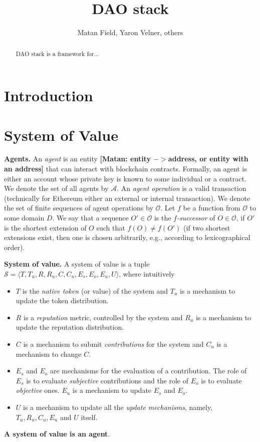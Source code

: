 \documentclass[10pt]{llncs}
\newcommand{\MyComment}[1]{{\textbf{\color{blue} [Matan: #1]}}}
\begin{document}
%

\pagestyle{plain}
 


\newcommand{\AppendixContent}[1]{}


\title{DAO stack}

\author{Matan Field, Yaron Velner, others}
\institute{}

\maketitle

\begin{abstract}
DAO stack is a framework for...
\end{abstract}
\section{Introduction}
\section{System of Value}
\noindent \textbf{Agents.} An \emph{agent} is an entity \MyComment{entity $->$address, or entity with an address} that can interact with blockchain contracts. Formally, an agent is either an account whose private key is known to some individual or a contract.
\newcommand{\Agents}{\mathcal{A}}
We denote the set of all agents by $\Agents$.
An \emph{agent operation} is a valid transaction (technically for Ethereum either an external or internal transaction).
\newcommand{\AgentOperations}{\mathcal{O}}
We denote the set of finite sequences of agent operations by $\AgentOperations$.
Let $f$ be a function from $\mathcal{O}$ to some domain $D$.
We say that a sequence $O'\in \mathcal{O}$ is the \emph{$f$-successor} of $O\in \mathcal{O}$, if $O'$ is the shortest extension of $O$ such that $f(O)\neq f(O')$ (if two shortest extensions exist, then one is chosen arbitrarily, e.g., according to lexicographical order).

\noindent \textbf{System of value.}
\newcommand{\SysValue}{\mathcal{S}}
A system of value is a tuple $\SysValue = \langle T, T_u, R, R_u, C, C_u, E_s, E_o, E_u, U \rangle$, where
intuitively
\begin{itemize}
\item $T$ is the \emph{native token} (or value) of the system and $T_u$ is a mechanism to update the token distribution.
\item $R$ is a \emph{reputation} metric, controlled by the system and $R_u$ is a mechanism to update the reputation distribution.
\item $C$ is a mechanism to submit \emph{contributions} for the system and $C_u$ is a mechanism to change $C$.
\item $E_s$ and $E_o$ are mechanisms for the evaluation of a contribution. The role of $E_s$ is to evaluate \emph{subjective} contributions and the role of $E_o$ is to evaluate \emph{objective} ones. $E_u$ is a mechanism to update $E_s$ and $E_o$.
\item $U$ is a mechanism to update all the \emph{update mechanisms}, namely, $T_u, R_u, C_u, E_u$ and $U$ itself.
\end{itemize}
\textbf{A system of value is an agent}.
\end{document}
